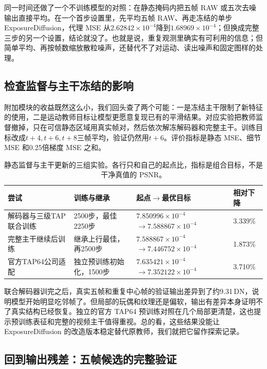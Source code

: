 \documentclass[11pt,a4paper,UTF8,fontset=fandol]{ctexart}
\newcommand{\dn}{\ensuremath{\,\mathrm{DN}}}
\begin{document}
同一时间还做了一个不训练模型的对照：在静态掩码内把五帧 RAW 或五次去噪输出直接平均。在一个首步设置里，先平均五帧 RAW、再走冻结的单步 ExposureDiffusion，代理 MSE 从$2.62842\times10^{-4}$降到$1.68969\times10^{-4}$；但换成完整三步的另一个设置，结论就没了。也就是说，重复观测里确实有可利用的信息；但简单平均、再按帧数缩放散粒噪声，还替代不了对运动、读出噪声和固定图样的处理。

\subsection{检查监督与主干冻结的影响}

附加模块的收益既然这么小，我们回头查了两个可能：一是冻结主干限制了新特征的使用，二是运动教师目标让模型更愿意复现已有的平滑结果。对应实验把教师监督撤掉，只在可信静态区域用真实帧对，然后依次解冻解码器和完整主干。训练目标改成$t+4,t+6,t+8$三帧平均，验证仍然用$t+6$。评价指标是静态 MSE、细节 MSE 和0.25倍梯度 MSE 之和。

\begin{table}[!htbp]
\centering\small
\caption{静态监督与主干更新的三组实验。各行只和自己的起点比，指标是组合目标，不是干净真值的 PSNR。}
\label{tab:djc_unfreeze}
\begin{tabular}{P{0.22\textwidth}P{0.23\textwidth}P{0.28\textwidth}P{0.14\textwidth}}
\toprule
尝试 & 训练与继承 & 起点$\rightarrow$最优目标 & 相对下降 \\
\midrule
解码器与三级TAP联合训练 & 2500步，最佳2250步 & $7.850996\times10^{-4}$ $\rightarrow 7.588867\times10^{-4}$ & 3.339\% \\
完整主干继续后训练 & 继承上行最佳，再2500步 & $7.588867\times10^{-4}$ $\rightarrow 7.446752\times10^{-4}$ & 1.873\% \\
官方TAP64公司适配 & 独立预训练初始化，1500步 & $7.635421\times10^{-4}$ $\rightarrow 7.352122\times10^{-4}$ & 3.710\% \\
\bottomrule
\end{tabular}
\end{table}

联合解码器训完之后，真实五帧和重复中心帧的验证输出差异到了约9.31\dn，说明模型开始明显吃邻帧了。但局部的玩偶和纹理还是偏软，输出有差异本身证明不了真实结构已经恢复。独立的官方 TAP64 预训练对照在几个局部更清楚，这也提示预训练表征和完整的视频主干值得重视。总的看，这些结果没能让 ExposureDiffusion 的改造版本稳定替代原教师，我们就把它留作探索记录。

\subsection{回到输出残差：五帧候选的完整验证}
\end{document}
